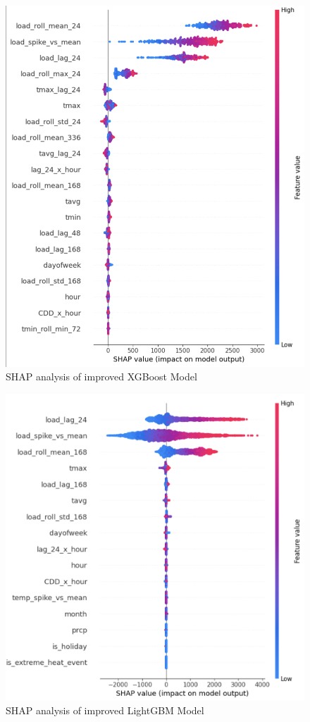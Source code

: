 \documentclass{ifacconf}
\begin{document}
\begin{figure}[htbp]
    \centering
    \includegraphics[width=1\linewidth]{shapboost.png} 
    \caption{SHAP analysis of improved XGBoost Model}
    \label{fig:load_patterns}
\end{figure}

\begin{figure}[htbp]
    \centering
    \includegraphics[width=1\linewidth]{shaplightgbm.png} 
    \caption{SHAP analysis of improved LightGBM Model}
    \label{fig:load_patterns}
\end{figure}



\end{document}
